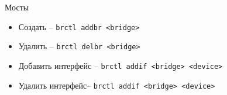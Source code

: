 \begin{frame}{Мосты}
	\begin{itemize}
		\item Создать -- {\tt brctl addbr <bridge>}
		\item Удалить -- {\tt brctl delbr <bridge>}
		\item Добавить интерфейс -- {\tt brctl addif <bridge> <device>}
		\item Удалить интерфейс-- {\tt brctl addif <bridge> <device>}
	\end{itemize}
\end{frame}


